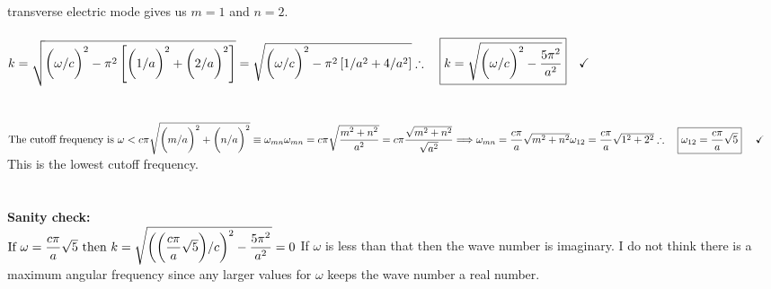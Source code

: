 \documentclass[fleqn]{article}
\begin{document}
\begin{enumerate}
\begin{enumerate}
{          transverse electric mode gives us $m=1$ and $n=2$.
          \\
          \\
          $
            k=\sqrt{\bigg( \omega/c \bigg)^2- \pi^2 \left[ \bigg( 1/a \bigg)^2+\bigg( 2/a \bigg)^2 \right]}
            =\sqrt{\bigg( \omega/c \bigg)^2- \pi^2 \left[ 1/a^2 + 4/a^2 \right]}
            \\
            \\
            \\
            \therefore ~~~ \boxed{
              k=\sqrt{\bigg( \omega/c \bigg)^2- \dfrac{5 \pi^2}{a^2}}
            } ~~~ \checkmark
          $
          \\
          \\
          \\
          $
            \text{The cutoff frequency is } \omega < c \pi \sqrt{\bigg( m/a \bigg)^2+\bigg( n/a \bigg)^2} \equiv \omega_{mn}
            \\
            \\
            \\
            \omega_{mn}=c \pi \sqrt{\dfrac{m^2+n^2}{a^2}}=c \pi \dfrac{\sqrt{m^2+n^2}}{\sqrt{a^2}}
            \Longrightarrow \omega_{mn}=\dfrac{c \pi}{a} \sqrt{m^2+n^2}
            \\
            \\
            \\
            \omega_{12}=\dfrac{c \pi}{a} \sqrt{1^2+2^2}
            \\
            \\
            \\
            \therefore ~~~ \boxed{
              \omega_{12}=\dfrac{c \pi}{a} \sqrt{5}
            } ~~~~ \checkmark ~~~~
          $
          This is the lowest cutoff frequency.
          \\
          \\
          \\
          \textbf{Sanity check:}
          \\
          $
            \text{If } \omega=\dfrac{c \pi}{a} \sqrt{5} \text{ then } k=\sqrt{\bigg( \bigg( \dfrac{c \pi}{a} \sqrt{5} \bigg) /c \bigg)^2- \dfrac{5 \pi^2}{a^2}}=0
            \\
            \\
          $
          If $\omega$ is less than that then the wave number is imaginary. I do not think there is a maximum angular frequency since any
          larger values for $\omega$ keeps the wave number a real number.
          \\
          \\
        }


\end{enumerate}
\end{enumerate}
\end{document}
